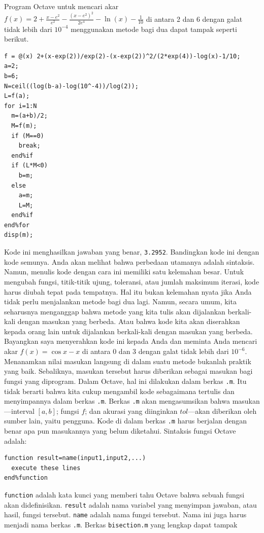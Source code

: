 Program Octave untuk mencari akar $f(x)=2+\frac{x-e^{2}}{e^{2}}-\frac{(x-e^{2})^{2}}{2e^{4}}-\ln(x)-\frac{1}{10}$
di antara 2 dan 6 dengan galat tidak lebih dari $10^{-4}$ menggunakan
metode bagi dua dapat tampak seperti berikut. \begin{verbatim}
f = @(x) 2+(x-exp(2))/exp(2)-(x-exp(2))^2/(2*exp(4))-log(x)-1/10;
a=2;
b=6;
N=ceil((log(b-a)-log(10^-4))/log(2));
L=f(a);
for i=1:N
  m=(a+b)/2;
  M=f(m);
  if (M==0)
    break;
  end%if
  if (L*M<0)
    b=m;
  else
    a=m;
    L=M;
  end%if
end%for
disp(m);
\end{verbatim} Kode ini menghasilkan jawaban yang benar, \texttt{3.2952}. Bandingkan
kode ini dengan kode semunya. Anda akan melihat bahwa perbedaan utamanya
adalah sintaksis. Namun, menulis kode dengan cara ini memiliki satu
kelemahan besar. Untuk mengubah fungsi, titik-titik ujung, toleransi,
atau jumlah maksimum iterasi, kode harus diubah tepat pada tempatnya.
Hal itu bukan kelemahan nyata jika Anda tidak perlu menjalankan metode
bagi dua lagi. Namun, secara umum, kita seharusnya menganggap bahwa
metode yang kita tulis akan dijalankan berkali-kali dengan masukan
yang berbeda. Atau bahwa kode kita akan diserahkan kepada orang lain
untuk dijalankan berkali-kali dengan masukan yang berbeda. Bayangkan
saya menyerahkan kode ini kepada Anda dan meminta Anda mencari akar
$f(x)=\cos x-x$ di antara 0 dan 3 dengan galat tidak lebih dari $10^{-6}$.
Menanamkan nilai masukan langsung di dalam suatu metode bukanlah praktik
yang baik. Sebaliknya, masukan tersebut harus diberikan sebagai masukan
bagi fungsi yang diprogram. Dalam Octave, hal ini dilakukan dalam
berkas \texttt{.m}. Itu tidak berarti bahwa kita cukup mengambil kode
sebagaimana tertulis dan menyimpannya dalam berkas \texttt{.m}. Berkas
\texttt{.m} akan mengasumsikan bahwa masukan---interval $[a,b]$;
fungsi $f$; dan akurasi yang diinginkan $tol$---akan diberikan
oleh sumber lain, yaitu pengguna. Kode di dalam berkas \texttt{.m}
harus berjalan dengan benar apa pun masukannya yang belum diketahui.
Sintaksis fungsi Octave adalah: \begin{verbatim}
function result=name(input1,input2,...)
  execute these lines
end%function
\end{verbatim} \texttt{function} adalah kata kunci yang memberi tahu Octave bahwa
sebuah fungsi akan didefinisikan. \texttt{result} adalah nama variabel
yang menyimpan jawaban, atau hasil, fungsi tersebut. \texttt{name}
adalah nama fungsi tersebut. Nama ini juga harus menjadi nama berkas
\texttt{.m}. Berkas \texttt{bisection.m} yang lengkap dapat tampak
